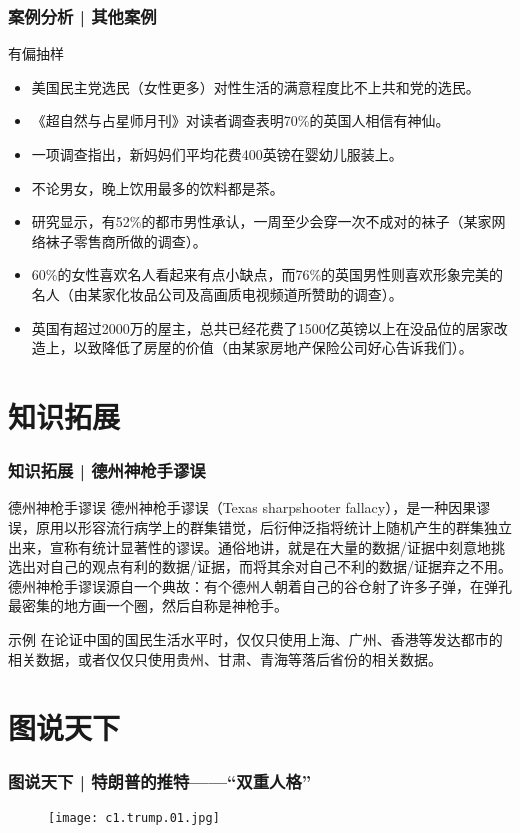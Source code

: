 \begin{frame}
  \frametitle{案例分析 | 其他案例}
  \begin{block}{有偏抽样}
    \begin{itemize}
      \item 美国民主党选民（女性更多）对性生活的满意程度比不上共和党的选民。
      \item 《超自然与占星师月刊》对读者调查表明70\%的英国人相信有神仙。
      \item 一项调查指出，新妈妈们平均花费400英镑在婴幼儿服装上。
      \item 不论男女，晚上饮用最多的饮料都是茶。
      \item 研究显示，有52\%的都市男性承认，一周至少会穿一次不成对的袜子（某家网络袜子零售商所做的调查）。
      \item 60\%的女性喜欢名人看起来有点小缺点，而76\%的英国男性则喜欢形象完美的名人（由某家化妆品公司及高画质电视频道所赞助的调查）。
      \item 英国有超过2000万的屋主，总共已经花费了1500亿英镑以上在没品位的居家改造上，以致降低了房屋的价值（由某家房地产保险公司好心告诉我们）。
    \end{itemize}
  \end{block}
\end{frame}

\section{知识拓展}
\begin{frame}
  \frametitle{知识拓展 | 德州神枪手谬误}
  \begin{block}{德州神枪手谬误}
    德州神枪手谬误（Texas sharpshooter fallacy），是一种因果谬误，原用以形容流行病学上的群集错觉，后衍伸泛指将统计上随机产生的群集独立出来，宣称有统计显著性的谬误。通俗地讲，就是在大量的数据/证据中刻意地挑选出对自己的观点有利的数据/证据，而将其余对自己不利的数据/证据弃之不用。\\
    德州神枪手谬误源自一个典故：有个德州人朝着自己的谷仓射了许多子弹，在弹孔最密集的地方画一个圈，然后自称是神枪手。
  \end{block}
  \pause
  \begin{block}{示例}
    在论证中国的国民生活水平时，仅仅只使用上海、广州、香港等发达都市的相关数据，或者仅仅只使用贵州、甘肃、青海等落后省份的相关数据。
  \end{block}
\end{frame}

\section{图说天下}
\begin{frame}
  \frametitle{图说天下 | 特朗普的推特——“双重人格”}
  \begin{figure}
    \centering
    \texttt{[image: c1.trump.01.jpg]}
  \end{figure}
\end{frame}

